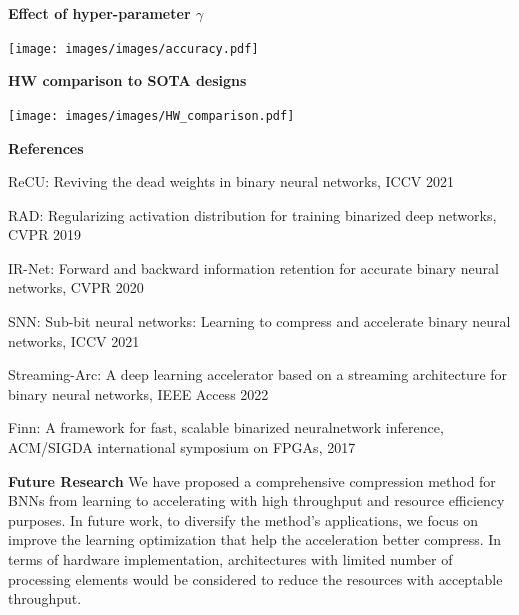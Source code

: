 \documentclass[landscape,a0paper,fontscale=0.292]{baposter}
\newcommand{\subheadercolor}{black}
\begin{document}
\begin{poster}
{\begin{minipage}[t]{0.5\linewidth}
\end{minipage}
\hfill
 \begin{minipage}[t]{0.48\linewidth}
 \vspace{1em}
 \textbf{\color{\subheadercolor}Effect of hyper-parameter $\gamma$}
 \vspace{-0.5em}
 \begin{center}
 	\texttt{[image: images/images/accuracy.pdf]}
 \end{center}
 \vspace{-0.5em}  
 \textbf{\color{\subheadercolor}HW comparison to SOTA designs}
 \begin{center}
 	\texttt{[image: images/images/HW\_comparison.pdf]}
 \end{center} 
 \vspace{-0.5em}
 \textbf{\color{\subheadercolor}References}
 \vspace{0.4em}
 \begin{enumerate}[leftmargin=*,label={[\arabic*]}]
 	\tiny
 	\item ReCU: Reviving the dead weights in binary neural networks, ICCV 2021
 	\item RAD: Regularizing activation distribution for training binarized deep networks, CVPR 2019
 	\item IR-Net: Forward and backward information retention for accurate binary neural networks, CVPR 2020
 	\item SNN: Sub-bit neural networks: Learning to compress and accelerate binary neural networks, ICCV 2021
 	\item Streaming-Arc: A deep learning accelerator based on a streaming architecture for binary neural networks, IEEE Access 2022
 	\item Finn: A framework for fast, scalable binarized neuralnetwork inference, ACM/SIGDA international symposium on FPGAs, 2017
 \end{enumerate}
 \vspace{0.5em}
 \textbf{\color{\subheadercolor}Future Research}
 \vspace{0.4em}
 \newline
 \tiny
 We have proposed a comprehensive compression method for BNNs from learning to accelerating with high throughput and resource efficiency purposes.
 In future work, to diversify the method's applications, we focus on improve the learning optimization that help the acceleration better compress.
 In terms of hardware implementation, architectures with limited number of processing elements would be considered to reduce the resources with acceptable throughput.
\end{minipage} 

}


\end{poster}
\end{document}
